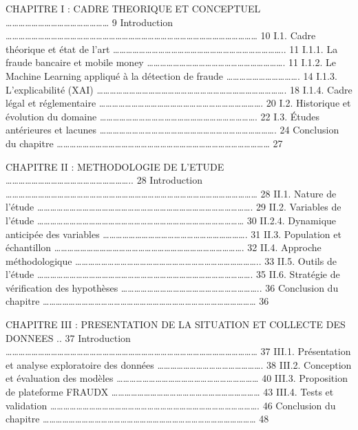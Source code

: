 \documentclass[
  12pt,
]{article}
\begin{document}
CHAPITRE I : CADRE THEORIQUE ET CONCEPTUEL ………………………………………… 9
Introduction ……………………………………………………………………………………………………… 10 I.1. Cadre
théorique et état de l’art …………………………………………………………………….. 11 I.1.1. La
fraude bancaire et mobile money ………………………………………………………. 11 I.1.2. Le
Machine Learning appliqué à la détection de fraude ……………………………. 14
I.1.3. L’explicabilité (XAI) ……………………………………………………………………………. 18 I.1.4.
Cadre légal et réglementaire …………………………………………………………………. 20 I.2.
Historique et évolution du domaine ………………………………………………………………. 22 I.3.
Études antérieures et lacunes ………………………………………………………………………. 24 Conclusion
du chapitre ……………………………………………………………………………………… 27

CHAPITRE II : METHODOLOGIE DE L’ETUDE ………………………………………………….. 28
Introduction ……………………………………………………………………………………………………… 28 II.1. Nature de
l’étude ………………………………………………………………………………………. 29 II.2. Variables de l’étude
…………………………………………………………………………………… 30 II.2.4. Dynamique anticipée des
variables …………………………………………………………. 31 II.3. Population et échantillon
……………………………………………………………………………. 32 II.4. Approche méthodologique
………………………………………………………………………….. 33 II.5. Outils de l’étude
………………………………………………………………………………………. 35 II.6. Stratégie de vérification
des hypothèses ……………………………………………………….. 36 Conclusion du chapitre
……………………………………………………………………………………… 36

CHAPITRE III : PRESENTATION DE LA SITUATION ET COLLECTE DES DONNEES ..
37 Introduction ……………………………………………………………………………………………………… 37 III.1.
Présentation et analyse exploratoire des données …………………………………………. 38
III.2. Conception et évaluation des modèles ………………………………………………………… 40
III.3. Proposition de plateforme FRAUDX …………………………………………………………… 43
III.4. Tests et validation ……………………………………………………………………………………. 46
Conclusion du chapitre ……………………………………………………………………………………… 48
\end{document}
